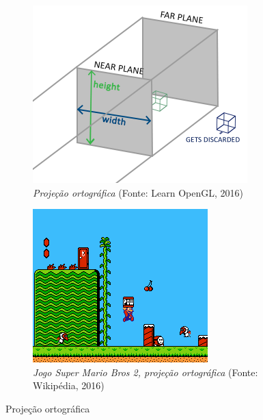 \begin{figure}[H]
	\begin{subfigure}[b]{0.4\textwidth}
		\includegraphics[width=\textwidth]{imagens/orthographic_frustum.png}
		\caption{\textit{Projeção ortográfica} (Fonte: Learn OpenGL, 2016)}
		\label{fig:ortofrustum}
	\end{subfigure}
	\hfill
	\begin{subfigure}[b]{0.4\textwidth}
		\includegraphics[width=\textwidth]{imagens/mariobros2.png}
		\caption{\textit{Jogo Super Mario Bros 2, projeção ortográfica} (Fonte: Wikipédia, 2016)}
		\label{fig:mariobros2}
	\end{subfigure}
	\caption{Projeção ortográfica}
\end{figure}

